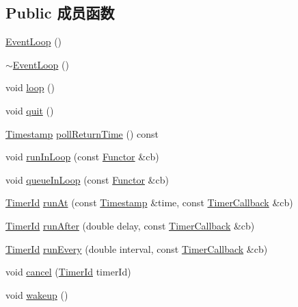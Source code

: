\subsection*{Public 成员函数}
\begin{DoxyCompactItemize}
\item 
\hyperlink{classmuduo_1_1EventLoop_a2bb4ef53c2b77f2313fe0db9fc952450}{Event\+Loop} ()
\item 
\hyperlink{classmuduo_1_1EventLoop_ad39d140230e71b90198d0ed03e0c21f2}{$\sim$\+Event\+Loop} ()
\item 
void \hyperlink{classmuduo_1_1EventLoop_afe461d27b9c48d5921c00d521181f12f}{loop} ()
\item 
void \hyperlink{classmuduo_1_1EventLoop_a2463a3acef2df4c951ce942a3229e44e}{quit} ()
\item 
\hyperlink{classmuduo_1_1Timestamp}{Timestamp} \hyperlink{classmuduo_1_1EventLoop_a5c4a9a6cf52fc408cdd33c8445fb5127}{poll\+Return\+Time} () const
\item 
void \hyperlink{classmuduo_1_1EventLoop_acf6a4570703c6edf29ae2d28cf6767cb}{run\+In\+Loop} (const \hyperlink{classmuduo_1_1EventLoop_aa47556388c5bf0b2534c9816841d8e7a}{Functor} \&cb)
\item 
void \hyperlink{classmuduo_1_1EventLoop_a7d2b6939f8f94715d253c0d4c6cee207}{queue\+In\+Loop} (const \hyperlink{classmuduo_1_1EventLoop_aa47556388c5bf0b2534c9816841d8e7a}{Functor} \&cb)
\item 
\hyperlink{classmuduo_1_1TimerId}{Timer\+Id} \hyperlink{classmuduo_1_1EventLoop_aa4a2472f0030a6f2076aa56e21830f6f}{run\+At} (const \hyperlink{classmuduo_1_1Timestamp}{Timestamp} \&time, const \hyperlink{namespacemuduo_a5f7453c2a15825e79bddf5deaec707bf}{Timer\+Callback} \&cb)
\item 
\hyperlink{classmuduo_1_1TimerId}{Timer\+Id} \hyperlink{classmuduo_1_1EventLoop_ae770f8cb708dfacf455d71d6977e5436}{run\+After} (double delay, const \hyperlink{namespacemuduo_a5f7453c2a15825e79bddf5deaec707bf}{Timer\+Callback} \&cb)
\item 
\hyperlink{classmuduo_1_1TimerId}{Timer\+Id} \hyperlink{classmuduo_1_1EventLoop_a7bf9fa6b9440ac1053f475108297264e}{run\+Every} (double interval, const \hyperlink{namespacemuduo_a5f7453c2a15825e79bddf5deaec707bf}{Timer\+Callback} \&cb)
\item 
void \hyperlink{classmuduo_1_1EventLoop_af8b24b02bbff6a657fa5b0190bef9b9b}{cancel} (\hyperlink{classmuduo_1_1TimerId}{Timer\+Id} timer\+Id)
\item 
void \hyperlink{classmuduo_1_1EventLoop_ae674290a26ecbd622c5160e38e8a4fe9}{wakeup} ()

\end{DoxyCompactItemize}
